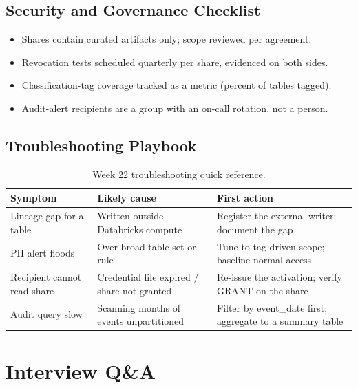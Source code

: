 \subsection{Security and Governance Checklist}
\begin{itemize}
    \item Shares contain curated artifacts only; scope reviewed per agreement.
    \item Revocation tests scheduled quarterly per share, evidenced on both sides.
    \item Classification-tag coverage tracked as a metric (percent of tables tagged).
    \item Audit-alert recipients are a group with an on-call rotation, not a person.
\end{itemize}

\subsection{Troubleshooting Playbook}
\begin{table}[H]
\centering
\small
\begin{tabular}{@{}p{3.6cm}p{4.2cm}p{4.8cm}@{}}
\toprule
\textbf{Symptom} & \textbf{Likely cause} & \textbf{First action} \\
\midrule
Lineage gap for a table & Written outside Databricks compute & Register the external writer; document the gap \\
PII alert floods & Over-broad table set or rule & Tune to tag-driven scope; baseline normal access \\
Recipient cannot read share & Credential file expired / share not granted & Re-issue the activation; verify GRANT on the share \\
Audit query slow & Scanning months of events unpartitioned & Filter by event\_date first; aggregate to a summary table \\
\bottomrule
\end{tabular}
\caption{Week 22 troubleshooting quick reference.}
\label{tab:ch22-trouble}
\end{table}

\section{Interview Q\&A}
